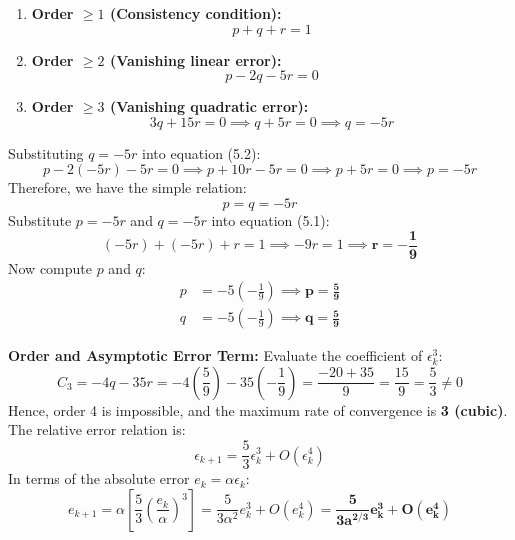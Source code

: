 \documentclass[11pt,a4paper]{article}
\numberwithin{equation}{section}
\begin{document}
\begin{solbox}
\begin{enumerate}[leftmargin=2em]
    \item \textbf{Order $\ge 1$ (Consistency condition):}
    \begin{equation}
        p + q + r = 1 \tag{5.1}
    \end{equation}
    \item \textbf{Order $\ge 2$ (Vanishing linear error):}
    \begin{equation}
        p - 2q - 5r = 0 \tag{5.2}
    \end{equation}
    \item \textbf{Order $\ge 3$ (Vanishing quadratic error):}
    \begin{equation}
        3q + 15r = 0 \implies q + 5r = 0 \implies q = -5r \tag{5.3}
    \end{equation}
\end{enumerate}
Substituting $q = -5r$ into equation (5.2):
\begin{equation}
    p - 2(-5r) - 5r = 0 \implies p + 10r - 5r = 0 \implies p + 5r = 0 \implies p = -5r
\end{equation}
Therefore, we have the simple relation:
\begin{equation}
    p = q = -5r
\end{equation}
Substitute $p = -5r$ and $q = -5r$ into equation (5.1):
\begin{equation}
    (-5r) + (-5r) + r = 1 \implies -9r = 1 \implies \mathbf{r = -\frac{1}{9}}
\end{equation}
Now compute $p$ and $q$:
\begin{align}
    p &= -5\left(-\frac{1}{9}\right) \implies \mathbf{p = \frac{5}{9}} \\
    q &= -5\left(-\frac{1}{9}\right) \implies \mathbf{q = \frac{5}{9}}
\end{align}

\noindent\textbf{Order and Asymptotic Error Term:}
Evaluate the coefficient of $\epsilon_k^3$:
\begin{equation}
    C_3 = -4q - 35r = -4\left(\frac{5}{9}\right) - 35\left(-\frac{1}{9}\right) = \frac{-20 + 35}{9} = \frac{15}{9} = \frac{5}{3} \ne 0
\end{equation}
Hence, order 4 is impossible, and the maximum rate of convergence is \textbf{3 (cubic)}.
The relative error relation is:
\begin{equation}
    \epsilon_{k+1} = \frac{5}{3} \epsilon_k^3 + O(\epsilon_k^4)
\end{equation}
In terms of the absolute error $e_k = \alpha \epsilon_k$:
\begin{equation}
    e_{k+1} = \alpha \left[ \frac{5}{3} \left(\frac{e_k}{\alpha}\right)^3 \right] = \frac{5}{3\alpha^2} e_k^3 + O(e_k^4) = \mathbf{\frac{5}{3 a^{2/3}} e_k^3 + O(e_k^4)}
\end{equation}


\end{solbox}
\end{document}

